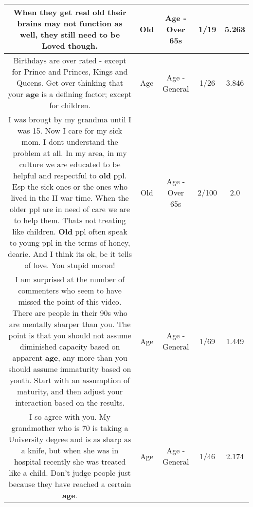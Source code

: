 \documentclass[11pt]{article}
\newlength\mylength
\begin{document}
\begin{center}
\begin{longtable}{|C{.65\mylength}|C{.30\mylength}|C{.12\mylength}|C{.12\mylength}|C{.12\mylength}|}
  \small When they get real \textbf{old} their brains may not function as well, they still need to be Loved though.\normalsize   & Old & Age - Over 65s & 1/19 & 5.263 \\  \hline
  \small Birthdays are over rated - except for Prince and Princes, Kings and Queens. Get over thinking that your \textbf{age} is a defining factor; except for children.\normalsize   & Age & Age - General & 1/26 & 3.846 \\  \hline
  \small I was brougt by my grandma until I was 15. Now I care for my sick mom. I dont understand the problem at all. In my area, in my culture we are educated to be helpful and respectful to \textbf{old} ppl. Esp the sick ones or the ones who lived in the II war time. When the older ppl are in need of care we are to help them. Thats not treating like children. \textbf{Old} ppl often speak to young ppl in the terms of honey, dearie. And I think its ok, bc it tells of love. You stupid moron!\normalsize   & Old & Age - Over 65s & 2/100 & 2.0 \\  \hline
  \small I am surprised at the number of commenters who seem to have missed the point of this video.  There are people in their 90s who are mentally sharper than you.  The point is that you should not assume diminished capacity based on apparent \textbf{age}, any more than you should assume immaturity based on youth.  Start with an assumption of maturity, and then adjust your interaction based on the results.\normalsize   & Age & Age - General & 1/69 & 1.449 \\  \hline
  \small I so agree with you.  My grandmother who is 70 is taking a University degree and is as sharp as a knife, but when she was in hospital recently she was treated like a child.  Don't judge people just because they have reached a certain \textbf{age}.\normalsize   & Age & Age - General & 1/46 & 2.174 \\  \hline

\end{longtable}
\end{center}
\end{document}
